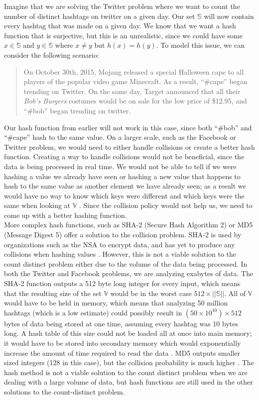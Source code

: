 \documentclass{article}
\begin{document}
\indent Imagine that we are solving the Twitter problem where we want to count the number of distinct hashtags on twitter on a given day. 
Our set $\mathbb{S}$ will now contain every hashtag that was made on a given day. 
We know that we want a hash function that is surjective, but this is an unrealistic, since we could have some $x \in \mathbb{S}$ and $y\in\mathbb{S}$ where $x \neq y$ but $h(x) = h(y)$. 
To model this issue, we can consider the following scenario:
\begin{quote}
On October 30th, 2015, Mojang released a special Halloween cape to all players of the popular video game Minecraft. 
As a result, ``\#cape'' began trending on Twitter.
On the same day, Target announced that all their \textit{Bob's Burgers} costumes would be on sale for the low price of \$12.95, and ``\#bob'' began trending on twitter.
\end{quote}
Our hash function from earlier will not work in this case, since both ``\#bob'' and ``\#cape'' hash to the same value. 
On a larger scale, such as the Facebook or Twitter problem, we would need to either handle collisions or create a better hash function. 
Creating a way to handle collisions would not be beneficial, since the data is being processed in real time. 
We would not be able to tell if we were hashing a value we already have seen or hashing a new value that happens to hash to the same value as another element we have already seen; as a result we would have no way to know which keys were different and which keys were the same when looking at $\mathbb{V}$ \cite[p. 6]{Maurer}. 
Since the collision policy would not help us, we need to come up with a better hashing function.\\

\indent More complex hash functions, such as SHA-2 (Secure Hash Algorithm 2) or MD5 (Message Digest 5) offer a solution to the collision problem. SHA-2 is used by organizations such as the NSA to encrypt data, and has yet to produce any collisions when hashing values \cite[p. 301]{SHA-Algo}. However, this is not a viable solution to the count distinct problem either due to the volume of the data being processed. In both the Twitter and Facebook problems, we are analyzing exabytes of data. The SHA-2 function outputs a 512 byte long integer for every input, which means that the resulting size of the set $\mathbb{V}$ would be in the worst case $512 \times ||\mathbb{S}||$. All of $\mathbb{V}$ would have to be held in memory, which means that analyzing 50 million hashtags (which is a low estimate)\cite{Twitter} could possibly result in $(50 \times 10^{10}) \times 512$ bytes of data being stored at one time, assuming every hashtag was 10 bytes long. A hash table of this size could not be loaded all at once into main memory; it would have to be stored into secondary memory which would exponentially increase the amount of time required to read the data \cite[p. 209]{Whang}. MD5 outputs smaller sized integers (128 in this case), but the collision probability is much higher \cite[p. 22 - 23]{Break-MD5}. The hash method is not a viable solution to the count distinct problem when we are dealing with a large volume of data, but hash functions are still used in the other solutions to the count-distinct problem.\\
\end{document}
